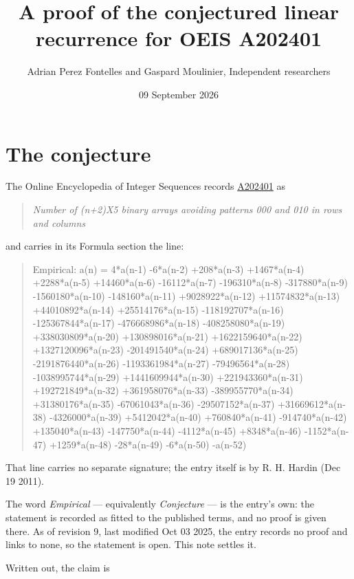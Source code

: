 \documentclass[11pt]{article}
\title{A proof of the conjectured linear recurrence for OEIS A202401}
\author{Adrian Perez Fontelles and Gaspard Moulinier, Independent researchers}
\date{09 September 2026}
\theoremstyle{definition}
\begin{document}
\maketitle
\section{The conjecture}

The Online Encyclopedia of Integer Sequences records \href{https://oeis.org/A202401}{A202401} as

\begin{quote}\itshape Number of (n+2)X5 binary arrays avoiding patterns 000 and 010 in rows and columns\end{quote}

and carries in its Formula section the line:

\begin{quote}\ttfamily Empirical: a(n) = 4*a(n-1) -6*a(n-2) +208*a(n-3) +1467*a(n-4) +2288*a(n-5) +14460*a(n-6) -16112*a(n-7) -196310*a(n-8) -317880*a(n-9) -1560180*a(n-10) -148160*a(n-11) +9028922*a(n-12) +11574832*a(n-13) +44010892*a(n-14) +25514176*a(n-15) -118192707*a(n-16) -125367844*a(n-17) -476668986*a(n-18) -408258080*a(n-19) +338030809*a(n-20) +130898016*a(n-21) +1622159640*a(n-22) +1327120096*a(n-23) -201491540*a(n-24) +689017136*a(n-25) -2191876440*a(n-26) -1193361984*a(n-27) -79496564*a(n-28) -1038995744*a(n-29) +1441609944*a(n-30) +221943360*a(n-31) +192721849*a(n-32) +361958076*a(n-33) -389955770*a(n-34) +31380176*a(n-35) -67061043*a(n-36) -29507152*a(n-37) +31669612*a(n-38) -4326000*a(n-39) +5412042*a(n-40) +760840*a(n-41) -914740*a(n-42) +135040*a(n-43) -147750*a(n-44) -4112*a(n-45) +8348*a(n-46) -1152*a(n-47) +1259*a(n-48) -28*a(n-49) -6*a(n-50) -a(n-52)\end{quote}

That line carries no separate signature; the entry itself is by R. H. Hardin (Dec 19 2011).

The word {\itshape Empirical} --- equivalently {\itshape Conjecture} --- is the entry's own: the statement is recorded as fitted to the published terms, and no proof is given there. As of revision 9, last modified Oct 03 2025, the entry records no proof and links to none, so the statement is open. This note settles it.

Written out, the claim is
\end{document}
